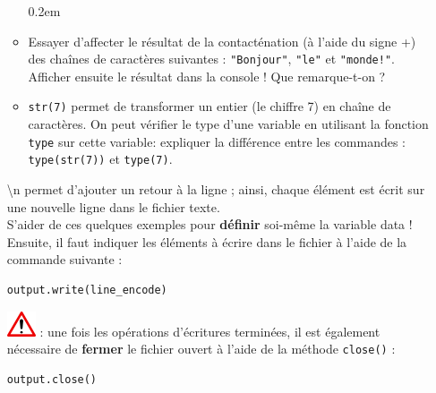 \documentclass[11pt]{article}
\begin{document}
\begin{enumerate}
\begin{minipage}[t]{0.88\textwidth}
\begin{itemize}\itemsep0.2em
\renewcommand\labelitemi{\--}
\item Essayer d'affecter le résultat de la contacténation (à l'aide du signe \og{}+\fg{}) des chaînes de caractères suivantes : \texttt{"Bonjour"}, \texttt{"le"} et \texttt{"monde!"}. Afficher ensuite le résultat dans la console ! Que remarque-t-on ?
\item \texttt{str(7)} permet de transformer un entier (le chiffre 7) en chaîne de caractères. On peut vérifier le type d'une variable en utilisant la fonction \texttt{type} sur cette variable: expliquer la différence entre les commandes : \texttt{type{(str(7))}} et \texttt{type{(7)}}.
\end{itemize}
\end{minipage}
\vspace*{1em}

\og{}\textbackslash{}n\fg{} permet d'ajouter un retour à la ligne ; ainsi, chaque élément est écrit sur une nouvelle ligne dans le fichier texte. \\

S'aider de ces quelques exemples pour \textbf{définir} soi-même la variable \og{}data\fg{} !\\


Ensuite, il faut indiquer les éléments à écrire dans le fichier à l'aide de la commande suivante : 
\vspace*{-0.64em}
\begin{center}
\begin{minipage}[t]{0.30\textwidth}
\begin{verbatim}
output.write(line_encode)
\end{verbatim}
\end{minipage}
\end{center}
\vspace*{1em}



\includegraphics[scale=1]{warningt.png} \underline{}: une fois les opérations d'écritures terminées, il est également nécessaire de \textbf{fermer} le fichier ouvert à l'aide de la méthode \texttt{close()} : 
\vspace*{-1em}
\begin{center}
\begin{minipage}[t]{0.18\textwidth}
\begin{verbatim}
output.close()
\end{verbatim}
\end{minipage}
\end{center}
\vspace*{1em}



\end{enumerate}
\end{document}
